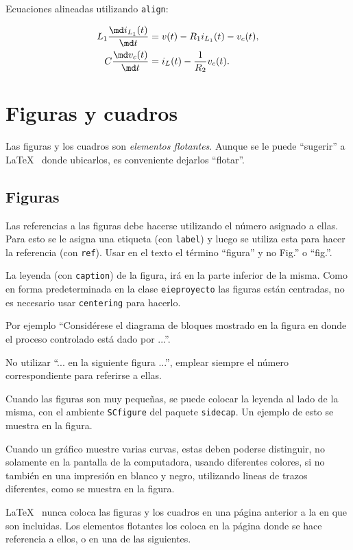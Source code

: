 Ecuaciones alineadas utilizando \texttt{align}:

\begin{align}
	L_1 \frac{\md i_{L_1} (t)}{\md t} &= v(t) - R_1 i_{L_1}(t) - v_c(t), \\
	C \frac{\md v_c (t)}{\md t} &= i_L(t)- \frac{1}{R_2} v_c(t).
\end{align}

\section{Figuras y cuadros}
Las figuras y los cuadros son \emph{elementos flotantes}. Aunque se le puede ``sugerir'' a \LaTeX~ donde ubicarlos, es conveniente dejarlos ``flotar''.

\subsection{Figuras}
Las referencias a las figuras debe hacerse utilizando el número asignado a ellas.  Para esto se le asigna una etiqueta (con \texttt{label}) y luego se utiliza esta para hacer la referencia (con \texttt{ref}).  Usar en el texto el término ``figura'' y no Fig.'' o ``fig.''.

La leyenda (con \texttt{caption}) de la figura, irá en la parte inferior de la misma.  Como en forma predeterminada en la clase \texttt{eieproyecto} las figuras están centradas, no es necesario usar \texttt{centering} para hacerlo.

Por ejemplo ``Considérese el diagrama de bloques mostrado en la figura en donde el proceso controlado está dado por ...''.

No utilizar ``... en la siguiente figura ...'', emplear siempre el número correspondiente para referirse a ellas.

Cuando las figuras son muy pequeñas, se puede colocar la leyenda al lado de la misma, con el ambiente \texttt{SCfigure} del paquete \texttt{sidecap}.  Un ejemplo de esto se muestra en la figura.

Cuando un gráfico muestre varias curvas, estas deben poderse distinguir, no solamente en la pantalla de la computadora, usando diferentes colores, si no también en una impresión en blanco y negro, utilizando lineas de trazos diferentes, como se muestra en la figura.

\LaTeX~ nunca coloca las figuras y los cuadros en una página anterior a la en que son incluidas.  Los elementos flotantes los coloca en la página donde se hace referencia a ellos, o en una de las siguientes.

